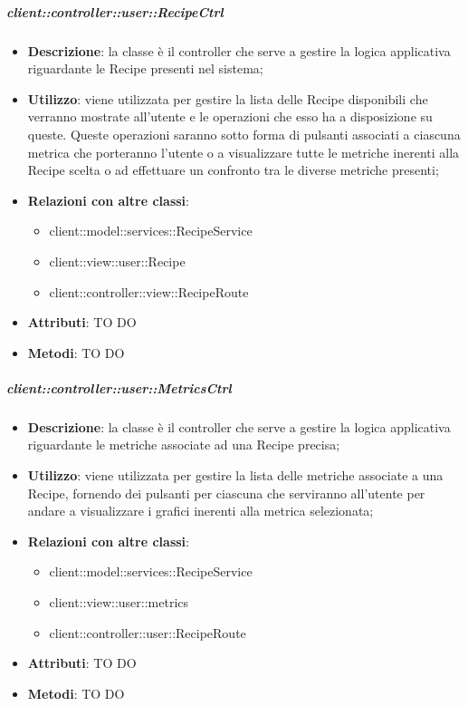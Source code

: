 		\subparagraph{client::controller::user::RecipeCtrl} %
		\label{subp:client_controller_user_recipectrl}
			\begin{itemize}
				\item \textbf{Descrizione}: la classe è il controller che serve a gestire la logica applicativa riguardante le Recipe presenti nel sistema;
				\item \textbf{Utilizzo}: viene utilizzata per gestire la lista delle Recipe disponibili che verranno mostrate all'utente e le operazioni che esso ha a disposizione su queste. Queste operazioni saranno sotto forma di pulsanti associati a ciascuna metrica che porteranno l'utente o a visualizzare tutte le metriche inerenti alla Recipe scelta o ad effettuare un confronto tra le diverse metriche presenti;
				\item \textbf{Relazioni con altre classi}:
					\begin{itemize}
						\item client::model::services::RecipeService
						\item client::view::user::Recipe
						\item client::controller::view::RecipeRoute
					\end{itemize}
				\item \textbf{Attributi}: TO DO
				\item \textbf{Metodi}: TO DO
			\end{itemize}

		\subparagraph{client::controller::user::MetricsCtrl} %
		\label{subp:client_controller_user_metricsctrl}
			\begin{itemize}
				\item \textbf{Descrizione}: la classe è il controller che serve a gestire la logica applicativa riguardante le metriche associate ad una Recipe precisa;
				\item \textbf{Utilizzo}: viene utilizzata per gestire la lista delle metriche associate a una Recipe, fornendo dei pulsanti per ciascuna che serviranno all'utente per andare a visualizzare i grafici inerenti alla metrica selezionata;
				\item \textbf{Relazioni con altre classi}:
					\begin{itemize}
						\item client::model::services::RecipeService
						\item client::view::user::metrics
						\item client::controller::user::RecipeRoute
					\end{itemize}
				\item \textbf{Attributi}: TO DO
				\item \textbf{Metodi}: TO DO
			\end{itemize}

